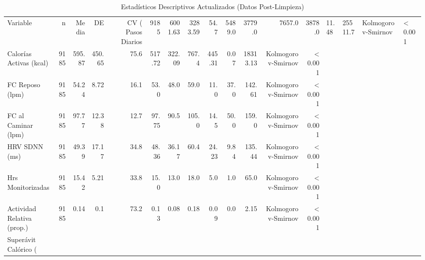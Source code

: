 \begin{table}[htbp]
\centering
\caption{Estadísticos Descriptivos Actualizados (Datos Post-Limpieza)}
\label{tab:descriptivos_actualizados}
\begin{tabular}{lrrrrrrrrrrrr}
\toprule
Variable & n & Media & DE & CV (%
\midrule
Pasos Diarios & 9185 & 6001.63 & 3283.59 & 54.7 & 5489.0 & 3779.0 & 7657.0 & 3878.0 & 11.48 & 25511.7 & Kolmogorov-Smirnov & < 0.001 \\
Calorías Activas (kcal) & 9185 & 595.87 & 450.65 & 75.6 & 517.72 & 322.09 & 767.4 & 445.31 & 0.07 & 18313.13 & Kolmogorov-Smirnov & < 0.001 \\
FC Reposo (lpm) & 9185 & 54.24 & 8.72 & 16.1 & 53.0 & 48.0 & 59.0 & 11.0 & 37.0 & 142.61 & Kolmogorov-Smirnov & < 0.001 \\
FC al Caminar (lpm) & 9185 & 97.77 & 12.38 & 12.7 & 97.75 & 90.5 & 105.0 & 14.5 & 50.0 & 159.0 & Kolmogorov-Smirnov & < 0.001 \\
HRV SDNN (ms) & 9185 & 49.39 & 17.17 & 34.8 & 48.36 & 36.17 & 60.4 & 24.23 & 9.84 & 135.44 & Kolmogorov-Smirnov & < 0.001 \\
Hrs Monitorizadas & 9185 & 15.42 & 5.21 & 33.8 & 15.0 & 13.0 & 18.0 & 5.0 & 1.0 & 65.0 & Kolmogorov-Smirnov & < 0.001 \\
Actividad Relativa (prop.) & 9185 & 0.14 & 0.1 & 73.2 & 0.13 & 0.08 & 0.18 & 0.09 & 0.0 & 2.15 & Kolmogorov-Smirnov & < 0.001 \\
Superávit Calórico (%
\bottomrule
\end{tabular}
\end{table}